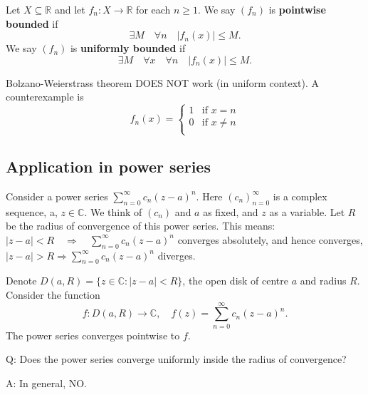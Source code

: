 \documentclass[a4paper]{article}
\begin{document}
\begin{definition}
    Let $X \subseteq \mathbb{R}$ and let $f_n:X\to \mathbb{R}$ for each $n\ge 1$. We say $(f_n)$ is \textbf{pointwise bounded} if 
    \[
        \exists M\quad \forall n\quad |f_n(x)|\le M. 
    \]
    We say $(f_n)$ is \textbf{uniformly bounded} if 
    \[
        \exists M \quad \forall x\quad \forall n \quad |f_n(x)|\le M. 
    \]
\end{definition}

\begin{note}
    Bolzano-Weierstrass theorem DOES NOT work (in uniform context). A counterexample is 
    \[
        f_n(x) = \begin{cases}
        1 &\text{if }x = n\\
        0 &\text{if }x\neq n\\
        \end{cases} 
    \]
\end{note}

\subsection{Application in power series}

Consider a power series $\sum_{n=0}^{\infty} c_{n}(z-a)^{n}$. Here $\left(c_{n}\right)_{n=0}^{\infty}$ is a complex sequence, a, $z \in \mathbb{C}$. We think of $\left(c_{n}\right)$ and $a$ as fixed, and $z$ as a variable.
Let $R$ be the radius of convergence of this power series. This means:
$|z-a|<R \quad \Longrightarrow \quad \sum_{n=0}^{\infty} c_{n}(z-a)^{n}$ converges absolutely, and hence converges, $|z-a|>R \Longrightarrow \sum_{n=0}^{\infty} c_{n}(z-a)^{n}$ diverges.

Denote $D(a, R)=\{z \in \mathbb{C}:|z-a|<R\}$, the open disk of centre $a$ and radius $R$. Consider the function
\[
f: D(a, R)  \rightarrow \mathbb{C},\quad
f(z) =\sum_{n=0}^{\infty} c_{n}(z-a)^{n}.
\]
The power series converges pointwise to $f$.

Q: Does the power series converge uniformly inside the radius of convergence?

A: In general, NO.
\end{document}
